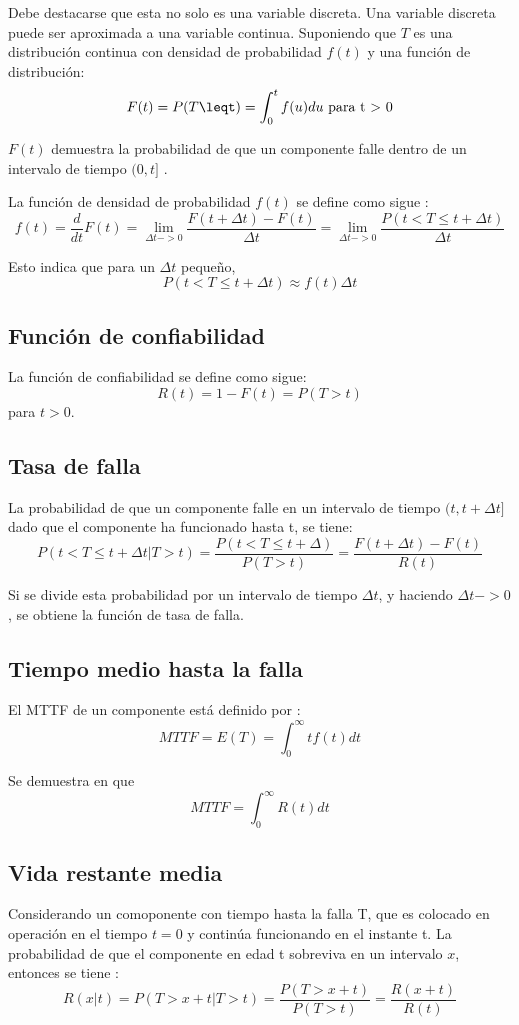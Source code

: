 Debe destacarse que esta no solo es una variable discreta. Una variable discreta puede ser aproximada a una variable continua. Suponiendo que $T$ es una distribución continua con densidad de probabilidad $f(t)$ y una función de distribución: $$F(t) = P(T\leqt) = \int_0^t f(u)du \text{ para t > 0}$$

$F(t)$ demuestra la probabilidad de que un componente falle dentro de un intervalo de tiempo $(0,t]$ \citep{Rausand04}.

La función de densidad de probabilidad $f(t)$ se define como sigue \citep{Rausand04}: $$f(t) = \frac{d}{dt}F(t) = \lim_{\Delta t->0}\frac{F(t+\Delta t) - F(t)}{\Delta t} = \lim_{\Delta t ->0} \frac{P(t<T\leq t + \Delta t)}{\Delta t}$$

Esto indica que para un $\Delta t$ pequeño, $$P(t < T \leq t + \Delta t) \approx f(t)\Delta t$$

\subsection{Función de confiabilidad}
La función de confiabilidad se define como sigue: $$R(t) =  1 - F(t) = P(T>t)$$ para $t>0$.

\subsection{Tasa de falla}
La probabilidad de que un componente falle en un intervalo de tiempo $(t, t+\Delta t]$ dado que el componente ha funcionado hasta t, se tiene: $$P(t < T \leq t + \Delta t | T > t) = \frac{P(t< T \leq t+\Delta)}{P(T>t)} = \frac{F(t+\Delta t) - F(t)}{R(t)}$$

Si se divide esta probabilidad por un intervalo de tiempo $\Delta t$, y haciendo $\Delta t -> 0$, se obtiene la función de tasa de falla.

\subsection{Tiempo medio hasta la falla}
El \ac{MTTF} de un componente está definido por \citep{FTDesign} \citep{Rausand04}: $$MTTF = E(T) = \int_0^\infty tf(t)dt$$

Se demuestra en \cite{Rausand04} que $$MTTF = \int_0^\infty R(t)dt$$

\subsection{Vida restante media}
Considerando un comoponente con tiempo hasta la falla T, que es colocado en operación en el tiempo $t = 0$ y continúa funcionando en el instante t.
La probabilidad de que el componente en edad t sobreviva en un intervalo $x$, entonces se tiene
\citep{Rausand04}: $$R(x|t) = P(T>x+t | T>t) = \frac{P(T>x+t)}{P(T>t)} = \frac{R(x+t)}{R(t)}$$

